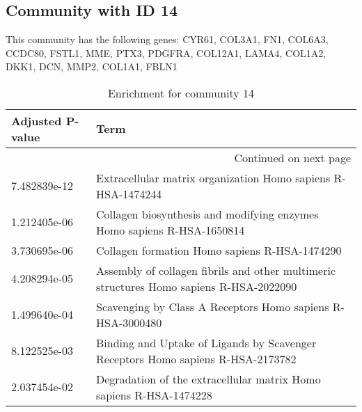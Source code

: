 \subsection*{Community with ID 14}
This community has the following genes: CYR61, COL3A1, FN1, COL6A3, CCDC80, FSTL1, MME, PTX3, PDGFRA, COL12A1, LAMA4, COL1A2, DKK1, DCN, MMP2, COL1A1, FBLN1
\\
\begin{longtable}{p{2.4cm}p{14.5cm}}
\caption{Enrichment for community 14}\\
\toprule
Adjusted \newline P-value &                                                                                     Term \\
\midrule
\endhead
\midrule
\multicolumn{2}{r}{{Continued on next page}} \\
\midrule
\endfoot

\bottomrule
\endlastfoot
             7.482839e-12 &                             Extracellular matrix organization Homo sapiens R-HSA-1474244 \\
             1.212405e-06 &                   Collagen biosynthesis and modifying enzymes Homo sapiens R-HSA-1650814 \\
             3.730695e-06 &                                            Collagen formation Homo sapiens R-HSA-1474290 \\
             4.208294e-05 &  Assembly of collagen fibrils and other multimeric structures Homo sapiens R-HSA-2022090 \\
             1.499640e-04 &                               Scavenging by Class A Receptors Homo sapiens R-HSA-3000480 \\
             8.122525e-03 &          Binding and Uptake of Ligands by Scavenger Receptors Homo sapiens R-HSA-2173782 \\
             2.037454e-02 &                       Degradation of the extracellular matrix Homo sapiens R-HSA-1474228 \\
\end{longtable}


